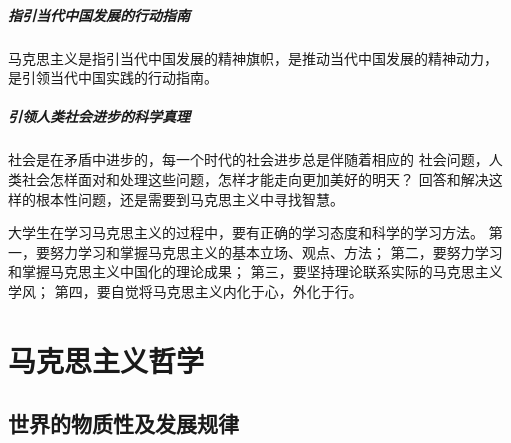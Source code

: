 \documentclass[11pt, UTF8]{book} %
\begin{document}
\subsubsection{指引当代中国发展的行动指南}
马克思主义是指引当代中国发展的精神旗帜，是推动当代中国发展的精神动力，
是引领当代中国实践的行动指南。
\subsubsection{引领人类社会进步的科学真理}
社会是在矛盾中进步的，每一个时代的社会进步总是伴随着相应的
社会问题，人类社会怎样面对和处理这些问题，怎样才能走向更加美好的明天？
回答和解决这样的根本性问题，还是需要到马克思主义中寻找智慧。

\vspace*{1em}
大学生在学习马克思主义的过程中，要有正确的学习态度和科学的学习方法。
第一，要努力学习和掌握马克思主义的基本立场、观点、方法；
第二，要努力学习和掌握马克思主义中国化的理论成果；
第三，要坚持理论联系实际的马克思主义学风；
第四，要自觉将马克思主义内化于心，外化于行。

\clearpage
\thispagestyle{empty}
\mainmatter

\part{马克思主义哲学}

\chapter{世界的物质性及发展规律}




\end{document}
